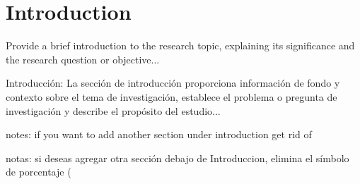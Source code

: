 \section{Introduction}

Provide a brief introduction to the research topic, explaining its significance and the research question or objective...

Introducción: La sección de introducción proporciona información de fondo y contexto sobre el tema de investigación, establece el problema o pregunta de investigación y describe el propósito del estudio... 

notes: if you want to add another section under introduction  get rid of %

notas: si deseas agregar otra sección debajo de Introduccion, elimina el símbolo de porcentaje (%

